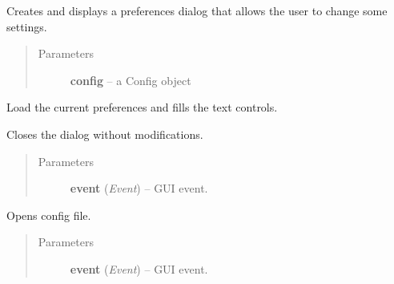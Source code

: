 \documentclass[letterpaper,10pt,english]{sphinxmanual}
\begin{document}
\begin{fulllineitems}
\label{wos:wos.PreferencesDialog}
Creates and displays a preferences dialog that allows the user to
change some settings.
\begin{quote}\begin{description}
\item[{Parameters}] \leavevmode
\textbf{config} -- a Config object

\end{description}\end{quote}

\begin{fulllineitems}
\label{wos:wos.PreferencesDialog.loadPreferences}
Load the current preferences and fills the text controls.

\end{fulllineitems}


\begin{fulllineitems}
\label{wos:wos.PreferencesDialog.onCancel}
Closes the dialog without modifications.
\begin{quote}\begin{description}
\item[{Parameters}] \leavevmode
\textbf{event} (\emph{Event}) -- GUI event.

\end{description}\end{quote}

\end{fulllineitems}


\begin{fulllineitems}
\label{wos:wos.PreferencesDialog.openConfig}
Opens config file.
\begin{quote}\begin{description}
\item[{Parameters}] \leavevmode
\textbf{event} (\emph{Event}) -- GUI event.

\end{description}\end{quote}


\end{fulllineitems}
\end{fulllineitems}
\end{document}
